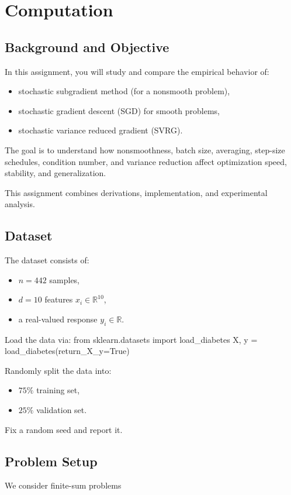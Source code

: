 \documentclass[en,hazy,blue,12pt,normal]{elegantnote}
\begin{document}
\section{Computation}
\subsection{Background and Objective}
In this assignment, you will study and compare the empirical behavior of:
\begin{itemize}
    \item stochastic subgradient method (for a nonsmooth problem),
    \item stochastic gradient descent (SGD) for smooth problems,
    \item stochastic variance reduced gradient (SVRG).
\end{itemize}

The goal is to understand how nonsmoothness, batch size, averaging, step-size schedules, condition number, and variance reduction affect optimization speed, stability, and generalization.

This assignment combines derivations, implementation, and experimental analysis.

\subsection{Dataset}
The dataset consists of:
\begin{itemize}
    \item $n=442$ samples,
    \item $d=10$ features $x_i \in \mathbb{R}^{10}$,
    \item a real-valued response $y_i \in \mathbb{R}$.
\end{itemize}

Load the data via:
from sklearn.datasets import load\_diabetes X, y = load\_diabetes(return\_X\_y=True)

Randomly split the data into:
\begin{itemize}
    \item $75 \%$ training set,
    \item $25 \%$ validation set.
\end{itemize}

Fix a random seed and report it.

\subsection{Problem Setup}
We consider finite-sum problems
\end{document}
